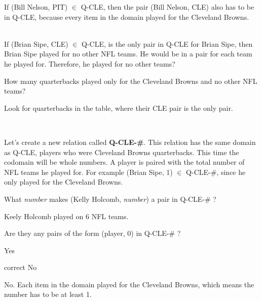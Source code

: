 \documentclass{ximera}
\begin{document}
\begin{fact}

If (Bill Nelson, PIT) $\in$ Q-CLE, then the pair (Bill Nelson, CLE) also has to be in Q-CLE, because every item in the domain played for the Cleveland Browns.

\quad \\

If (Brian Sipe, CLE) $\in$ Q-CLE, is the only pair in Q-CLE for Brian Sipe, then Brian Sipe played for no other NFL teams.  He would be in a pair for each team he played for. Therefore, he played for no other teams?



\begin{problem} How many quarterbacks played only for the Cleveland Browns and no other NFL teams? 
\begin{feedback}
Look for quarterbacks in the table, where their CLE pair is the only pair.
\end{feedback}
\end{problem}


\end{fact}


\quad \\


\begin{example}
Let's create a new relation called \textbf{Q-CLE-#}. This relation has the same domain as Q-CLE, players who were Cleveland Browns quarterbacks. This time the codomain will be whole numbers. A player is paired with the total number of NFL teams he played for.
For example (Brian Sipe, 1) $\in$ Q-CLE-#, since he only played for the Cleveland Browns.


\begin{problem} What \textit{number} makes (Kelly Holcomb, \textit{number}) a pair in Q-CLE-# ? 
\begin{feedback}
Keely Holcomb played on 6 NFL teams.
\end{feedback}
\end{problem}


\begin{multipleChoice} Are they any pairs of the form (player, 0) in Q-CLE-# ?
\item{Yes}
\item[correct]{No}
\begin{feedback}
No. Each item in the domain played for the Cleveland Browns, which means the number has to be at least 1.
\end{feedback}
\end{multipleChoice}


\end{example}
\end{document}
